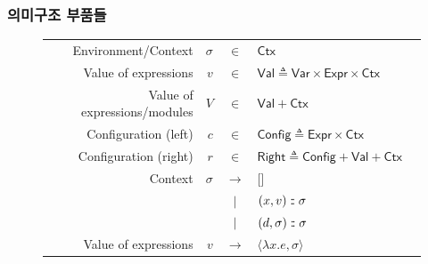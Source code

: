 \documentclass{beamer}
\theoremstyle{definition}
\newcommand*{\vbar}{|}
\newcommand*{\cons}{:{\hspace{-0.7em}}:}
\newcommand*{\Expr}{\mathsf{Expr}}
\newcommand*{\ExprVar}{\mathsf{Var}}
\newcommand*{\modid}{d}
\newcommand*{\ctx}{\sigma}
\newcommand*{\Ctx}{\mathsf{Ctx}}
\newcommand*{\Value}{\mathsf{Val}}
\newcommand*{\Config}{\mathsf{Config}}
\newcommand*{\config}{c}
\newcommand*{\Right}{\mathsf{Right}}
\newcommand*{\rightst}{r}
\begin{document}
\begin{frame}[c]
  \frametitle{의미구조 부품들}
  \begin{figure}[h!]
    \footnotesize
    \centering
    \begin{tabular}{rrcll}
      Environment/Context          & $\ctx$     & $\in$         & $\Ctx$                                            \\
      Value of expressions         & $v$        & $\in$         & $\Value \triangleq \ExprVar\times\Expr\times\Ctx$ \\
      Value of expressions/modules & $V$        & $\in$         & $\Value+\Ctx$                                     \\
      Configuration (left)         & $\config$  & $\in$         & $\Config\triangleq\Expr\times\Ctx$                \\
      Configuration (right)        & $\rightst$ & $\in$         & $\Right\triangleq\Config+\Value+\Ctx$             \\
      Context                      & $\ctx$     & $\rightarrow$ & []                                                \\
                                   &            & $\vbar$       & $(x,v)\cons \ctx$                                 \\
                                   &            & $\vbar$       & $(\modid,\ctx)\cons \ctx$                         \\
      Value of expressions         & $v$        & $\rightarrow$ & $\langle \lambda x.e, \ctx \rangle$\end{tabular}
  \end{figure}
\end{frame}
\end{document}
